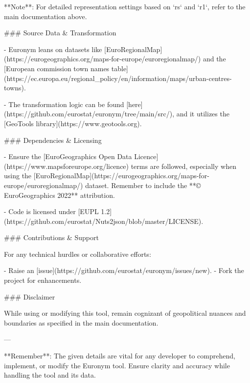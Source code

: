 **Note**: For detailed representation settings based on `rs` and `r1`, refer to the main documentation above.

### Source Data & Transformation

- Euronym leans on datasets like [EuroRegionalMap](https://eurogeographics.org/maps-for-europe/euroregionalmap/) and the [European commission town names table](https://ec.europa.eu/regional_policy/en/information/maps/urban-centres-towns).
  
- The transformation logic can be found [here](https://github.com/eurostat/euronym/tree/main/src/), and it utilizes the [GeoTools library](https://www.geotools.org).

### Dependencies & Licensing

- Ensure the [EuroGeographics Open Data Licence](https://www.mapsforeurope.org/licence) terms are followed, especially when using the [EuroRegionalMap](https://eurogeographics.org/maps-for-europe/euroregionalmap/) dataset. Remember to include the **© EuroGeographics 2022** attribution.
  
- Code is licensed under [EUPL 1.2](https://github.com/eurostat/Nuts2json/blob/master/LICENSE).

### Contributions & Support

For any technical hurdles or collaborative efforts:

- Raise an [issue](https://github.com/eurostat/euronym/issues/new).
- Fork the project for enhancements.
  
### Disclaimer

While using or modifying this tool, remain cognizant of geopolitical nuances and boundaries as specified in the main documentation.

---

**Remember**: The given details are vital for any developer to comprehend, implement, or modify the Euronym tool. Ensure clarity and accuracy while handling the tool and its data.